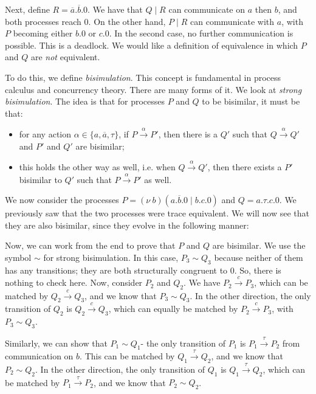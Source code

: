\documentclass[a4paper, openany]{memoir}
\theoremstyle{definition}
\begin{document}
    Next, define $R = \overline{a}.\overline{b}.0$. We have that $Q \mid R$ can communicate on $a$ then $b$, and both processes reach $0$. On the other hand, $P \mid R$ can communicate with $a$, with $P$ becoming either $b.0$ or $c.0$. In the second case, no further communication is possible. This is a deadlock. We would like a definition of equivalence in which $P$ and $Q$ are \emph{not} equivalent.

    To do this, we define \emph{bisimulation}. This concept is fundamental in process calculus and concurrency theory. There are many forms of it. We look at \emph{strong bisimulation}. The idea is that for processes $P$ and $Q$ to be bisimilar, it must be that:
    \begin{itemize}
        \item for any action $\alpha \in \{a, \overline{a}, \tau\}$, if $P \xrightarrow{\alpha} P'$, then there is a $Q'$ such that $Q \xrightarrow{\alpha} Q'$ and $P'$ and $Q'$ are bisimilar;
        \item this holds the other way as well, i.e. when $Q \xrightarrow{\alpha} Q'$, then there exists a $P'$ bisimilar to $Q'$ such that $P \xrightarrow{\alpha} P'$ as well.
    \end{itemize}

    We now consider the processes $P = (\nu \ b)(a.\overline{b}.0 \mid b.c.0)$ and $Q = a.\tau.c.0$. We previously saw that the two processes were trace equivalent. We will now see that they are also bisimilar, since they evolve in the following manner:

    Now, we can work from the end to prove that $P$ and $Q$ are bisimilar. We use the symbol $\sim$ for strong bisimulation. In this case, $P_3 \sim Q_3$ because neither of them has any transitions; they are both structurally congruent to $0$. So, there is nothing to check here. Now, consider $P_2$ and $Q_2$. We have $P_2 \xrightarrow{c} P_3$, which can be matched by $Q_2 \xrightarrow{c} Q_3$, and we know that $P_3 \sim Q_3$. In the other direction, the only transition of $Q_2$ is $Q_2 \xrightarrow{c} Q_3$, which can equally be matched by $P_2 \xrightarrow{c} P_3$, with $P_3 \sim Q_3$.

    Similarly, we can show that $P_1 \sim Q_1$- the only transition of $P_1$ is $P_1 \xrightarrow{\tau} P_2$ from communication on $b$. This can be matched by $Q_1 \xrightarrow{\tau} Q_2$, and we know that $P_2 \sim Q_2$. In the other direction, the only transition of $Q_1$ is $Q_1 \xrightarrow{\tau} Q_2$, which can be matched by $P_1 \xrightarrow{\tau} P_2$, and we know that $P_2 \sim Q_2$.
\end{document}
